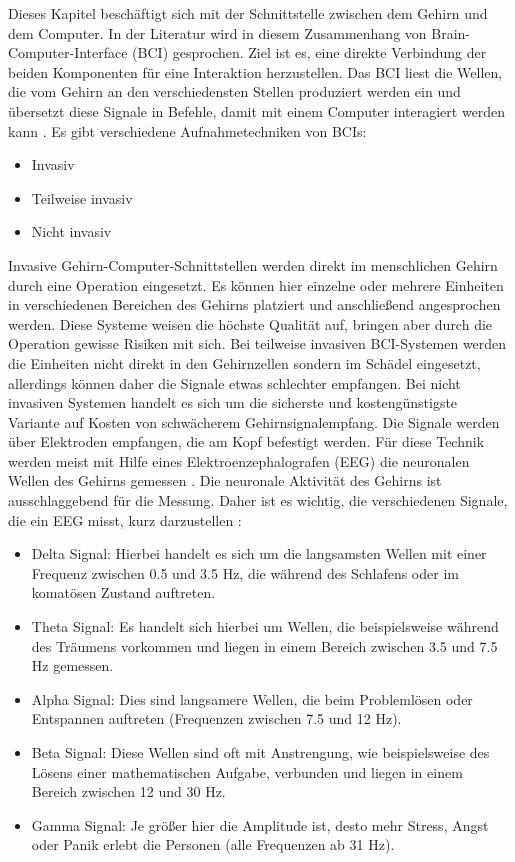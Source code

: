 Dieses Kapitel beschäftigt sich mit der Schnittstelle zwischen dem Gehirn und dem Computer. In der Literatur wird in diesem Zusammenhang von Brain-Computer-Interface (BCI) gesprochen. Ziel ist es, eine direkte Verbindung der beiden Komponenten für eine Interaktion herzustellen. Das BCI liest die Wellen, die vom Gehirn an den verschiedensten Stellen produziert werden ein und übersetzt diese Signale in Befehle, damit mit einem Computer interagiert werden kann \cite{BRAIN}.
\newline \newline
Es gibt verschiedene Aufnahmetechniken von BCIs:
\begin{itemize}
      \item Invasiv
      \item Teilweise invasiv
			\item Nicht invasiv
\end{itemize}
\vspace{\baselineskip}
Invasive Gehirn-Computer-Schnittstellen werden direkt im menschlichen Gehirn durch eine Operation eingesetzt. Es können hier einzelne oder mehrere Einheiten in verschiedenen Bereichen des Gehirns platziert und anschließend angesprochen werden. Diese Systeme weisen die höchste Qualität auf, bringen aber durch die Operation gewisse Risiken mit sich.
Bei teilweise invasiven BCI-Systemen werden die Einheiten nicht direkt in den Gehirnzellen sondern im Schädel eingesetzt, allerdings können daher die Signale etwas schlechter empfangen. Bei nicht invasiven Systemen handelt es sich um die sicherste und kostengünstigste Variante auf Kosten von schwächerem Gehirnsignalempfang. Die Signale werden über Elektroden empfangen, die am Kopf befestigt werden. Für diese Technik werden meist mit Hilfe eines Elektroenzephalografen (EEG) die neuronalen Wellen des Gehirns gemessen \cite{BRAIN}.
\newline \newline 
Die neuronale Aktivität des Gehirns ist ausschlaggebend für die Messung. Daher ist es wichtig, die verschiedenen Signale, die ein EEG misst, kurz darzustellen \cite{BRAIN}:
\begin{itemize}
      \item Delta Signal: Hierbei handelt es sich um die langsamsten Wellen mit einer Frequenz zwischen 0.5 und 3.5 Hz, die während des Schlafens oder im komatösen Zustand auftreten.
      \item Theta Signal: Es handelt sich hierbei um Wellen, die beispielsweise während des Träumens vorkommen und liegen in einem Bereich zwischen 3.5 und 7.5 Hz gemessen.
			\item Alpha Signal: Dies sind langsamere Wellen, die beim Problemlösen oder Entspannen auftreten (Frequenzen zwischen 7.5 und 12 Hz).
			\item Beta Signal: Diese Wellen sind oft mit Anstrengung, wie beispielsweise des Lösens einer mathematischen Aufgabe, verbunden und liegen in einem Bereich zwischen 12 und 30 Hz.
      \item Gamma Signal: Je größer hier die Amplitude ist, desto mehr Stress, Angst oder Panik erlebt die Personen (alle Frequenzen ab 31 Hz).
\end{itemize}
